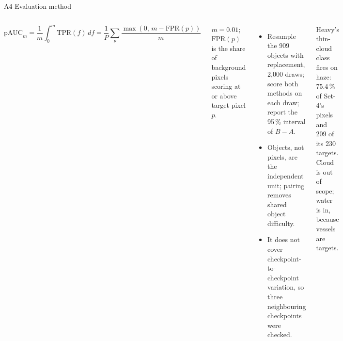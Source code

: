 \documentclass[aspectratio=169,10pt]{beamer}
\newcommand{\eqs}[1]{{\fontsize{7.6}{9.4}\selectfont #1\par}}
\newcommand{\tx}[1]{{\fontsize{6.6}{7.9}\selectfont #1\par}}
\begin{document}
\begin{frame}{A4 Evaluation method}
\begin{columns}[T,onlytextwidth]
\par\vspace{-1.5mm}
\eqs{\[\mathrm{pAUC}_m=\frac1m\int_0^m\!\mathrm{TPR}(f)\,df=\frac1P\sum_{p}\frac{\max(0,\,m-\mathrm{FPR}(p))}{m}\]}
\vspace{-1mm}
\tx{$m=0.01$; $\mathrm{FPR}(p)$ is the share of background pixels scoring at or above target pixel $p$.}
\vspace{1mm}
\par
\begin{itemize}\setlength{\itemsep}{0.3mm}\fontsize{6.6}{7.9}\selectfont
\item Resample the 909 objects with replacement, 2,000 draws; score both methods on each draw; report the 95\,\% interval of $B-A$.
\item Objects, not pixels, are the independent unit; pairing removes shared object difficulty.
\item It does not cover checkpoint-to-checkpoint variation, so three neighbouring checkpoints were checked.
\end{itemize}
\par\vspace{0.3mm}
\par
{}
\vspace{1mm}
\par\vspace{0.2mm}
\tx{Heavy's thin-cloud class fires on haze: 75.4\,\% of Set-4's pixels and 209 of its 230 targets. Cloud is out of scope; water is in, because vessels are targets.}
\end{columns}
\end{frame}
\end{document}
